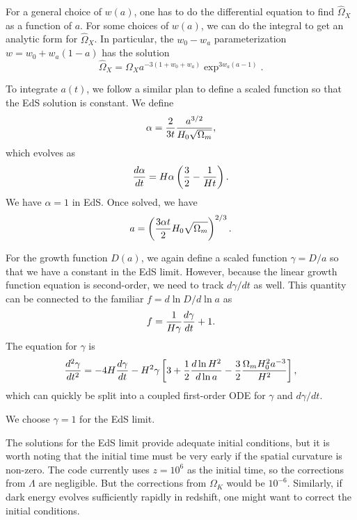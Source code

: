 \documentclass[11pt,preprint]{aastex}
\begin{document}
For a general choice of $w(a)$, one has to do the differential equation to
find $\hat\Omega_X$ as a function of $a$.
For some choices of $w(a)$, we
can do the integral to get an analytic form for $\hat\Omega_X$.
In particular, the $w_0-w_a$ parameterization $w = w_0+w_a(1-a)$ has the 
solution
\begin{equation}
\hat\Omega_X = \Omega_X a^{-3(1+w_0+w_a)} \exp^{3w_a(a-1)}.
\end{equation}

\bigskip

To integrate $a(t)$, we follow a similar plan to define a scaled function
so that the EdS solution is constant.  We define 
\begin{equation}
\alpha = {2\over 3t} {a^{3/2}\over H_0\sqrt{\Omega_m}},
\end{equation}
which evolves as
\begin{equation}
{d\alpha\over dt} = H\alpha \left({3\over2} - {1\over Ht}\right).
\end{equation}
We have $\alpha=1$ in EdS.  Once solved, we have
\begin{equation}
a = \left({3\alpha t\over 2} H_0\sqrt{\Omega_m}\right)^{2/3}.
\end{equation}

\bigskip

For the growth function $D(a)$, we again define a scaled function $\gamma = D/a$
so that we have a constant in the EdS limit.  However, because the linear
growth function equation is second-order, we need to track $d\gamma/dt$
as well.  This quantity can be connected to the familiar $f = d\ln D/d\ln a$
as 
\begin{equation}
f = {1\over H\gamma}{d\gamma\over dt} +1.
\end{equation}
The equation for $\gamma$ is 
\begin{equation}
{d^2\gamma\over dt^2} = -4H{d\gamma\over dt} - H^2\gamma
\left[ 3 + {1\over2}{d\ln H^2\over d\ln a} - {3\over 2} {\Omega_m H_0^2 a^{-3}\over H^2}
\right],
\end{equation}
which can quickly be split into a coupled first-order ODE for $\gamma$ and 
$d\gamma/dt$.

We choose $\gamma=1$ for the EdS limit.

\bigskip

The solutions for the EdS limit provide adequate initial conditions, but it 
is worth noting that the initial time must be very early if the spatial curvature
is non-zero.  The code currently uses $z=10^6$ as the initial time, so the 
corrections from $\Lambda$ are negligible.  But the corrections from $\Omega_K$
would be $10^{-6}$.  Similarly, if dark energy evolves sufficiently rapidly in
redshift, one might want to correct the initial conditions.
\end{document}
